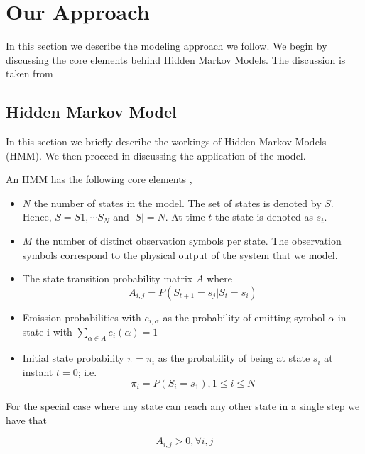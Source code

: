 \section{Our Approach}
In this section we describe the modeling approach we follow.
We begin by discussing the core elements behind Hidden Markov Models.
The discussion is taken from \cite{rabiner2009}

\subsection{Hidden Markov Model}
\label{hmm}

In this section we briefly describe the workings of Hidden Markov Models (HMM). We then proceed in discussing the application  of the model.


An HMM has the following core elements \cite{rocha2012}, \cite{rabiner2009}

\begin{itemize}
	\item $N$ the number of states in the model. The set of states is denoted by $S$. Hence, $S={S1,\cdots S_N}$ and $|S|=N$. At time $t$ the state is denoted as $s_t$.
	\item $M$ the number of distinct observation symbols per state.
	The observation symbols correspond to the physical output of the system that we model.
	\item The state transition probability matrix $A$ where
	\begin{equation}
	A_{i,j} = P(S_{t+1} = s_j | S_t=s_i)
	\label{transition_prob}
	\end{equation}
	\item Emission probabilities with $e_{i,\alpha}$ as the probability of emitting symbol $\alpha$ in state i with 
	$\sum_{\alpha \in A} e_{i}(\alpha) = 1$
	\item  Initial state probability $\pi = {\pi_i}$ as the probability of being at state $s_i$ at instant $t=0$; i.e.
	\begin{equation}
	\pi_i = P(S_i = s_1), 1 \leq i \leq N
	\label{initial_state}
	\end{equation} 
\end{itemize}

For the special case where any state can reach any other state in a single step we have that

\begin{equation}
A_{i,j} > 0, \forall i,j
\end{equation}

